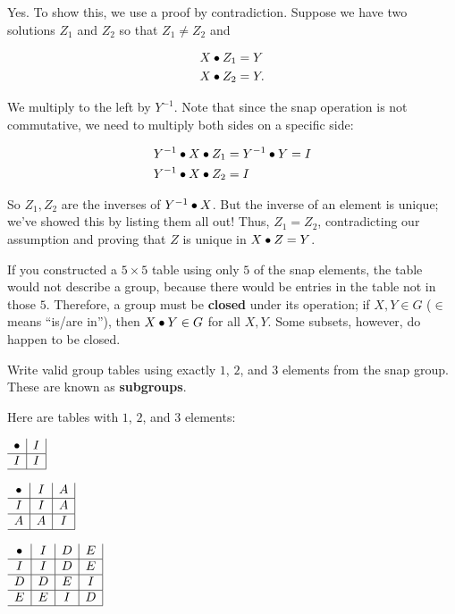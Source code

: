 \documentclass[../gatm_answers.tex]{subfiles}
\begin{document}
Yes. To show this, we use a proof by contradiction. Suppose we have two solutions $Z_1$ and $Z_2$ so that $Z_1\neq Z_2$ and

\begin{align*}
X\bullet Z_1 &= Y \\
X\bullet Z_2 &= Y.
\end{align*}

We multiply to the left by $Y^{-1}$. Note that since the snap operation is not commutative, we need to multiply both sides on a specific side:

\begin{align*}
Y^{-1} \bullet X\bullet Z_1 &= Y^{-1} \bullet Y = I \\
Y^{-1} \bullet X\bullet Z_2 &= I
\end{align*}

So $Z_1,Z_2$ are the inverses of $Y^{-1}\bullet X$. But the inverse of an element is unique; we've showed this by listing them all out! Thus, $Z_1=Z_2$, contradicting our assumption and proving that $Z$ is unique in $X\bullet Z = Y$.

\begin{outer_problem}
	\item If you constructed a $5\times 5$ table using only $5$ of the snap elements, the table would not describe a group, because there would be entries in the table not in those $5$.
	      Therefore, a group must be \textbf{closed} under its operation; if $X,Y\in G$ ($\in$ means ``is/are in''), then $X\bullet Y\in G$ for all $X,Y$.
	      Some subsets, however, do happen to be closed.

	      Write valid group tables using exactly $1$, $2$, and $3$ elements from the snap group. These are known as \textbf{subgroups}.\label{prob:group_definition_end}
\end{outer_problem}

Here are tables with $1$, $2$, and $3$ elements:

\begin{minipage}{0.3\textwidth}
$\begin{array}{c|c|}
\bullet & I \\ \hline
I & I \\ \hline
\end{array}$
\end{minipage}\hfill
\begin{minipage}{0.3\textwidth}
$\begin{array}{c|c|c|}
\bullet & I & A \\ \hline
I & I & A \\ \hline
A & A & I \\ \hline
\end{array}$
\end{minipage}\hfill
\begin{minipage}{0.3\textwidth}
$\begin{array}{c|c|c|c|}
\bullet & I & D & E \\ \hline
I & I & D & E \\ \hline
D & D & E & I \\ \hline
E & E & I & D \\ \hline
\end{array}$
\end{minipage}
\end{document}
